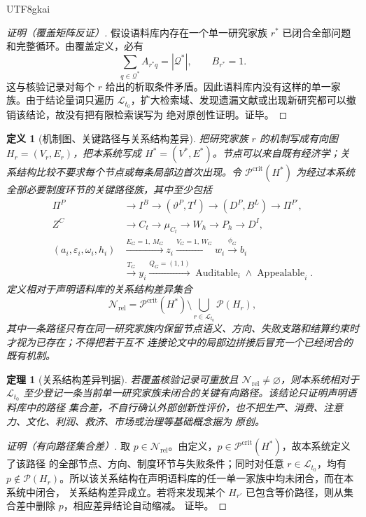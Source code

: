 \documentclass[12pt,a4paper,openany]{report}
\newtheorem{definition}{定义}[chapter]
\newtheorem{theorem}{定理}[chapter]
\DeclareMathOperator{\Auditable}{Auditable}
\DeclareMathOperator{\Appealable}{Appealable}
\begin{document}
\begin{CJK*}{UTF8}{gkai}
\begin{proof}[证明（覆盖矩阵反证）]
假设语料库内存在一个单一研究家族 \(r^*\) 已闭合全部问题和完整循环。由覆盖定义，必有
\[
  \sum_{q\in\mathcal Q^*}A_{r^*q}=|\mathcal Q^*|,
  \qquad B_{r^*}=1.
\]
这与核验记录对每个 \(r\) 给出的析取条件矛盾。因此语料库内没有这样的单一家族。由于结论量词只遍历
\(\mathcal L_{t_0}\)，扩大检索域、发现遗漏文献或出现新研究都可以撤销该结论，故没有把有限检索误写为
绝对原创性证明。证毕。
\end{proof}

\begin{definition}[机制图、关键路径与关系结构差异]
把研究家族 \(r\) 的机制写成有向图 \(H_r=(V_r,E_r)\)，把本系统写成
\(H^*=(V^*,E^*)\)。节点可以来自既有经济学；关系结构比较不要求每个节点或每条局部边首次出现。令
\(\mathcal P^{\mathrm{crit}}(H^*)\) 为经过本系统全部必要制度环节的关键路径族，其中至少包括
\[
\begin{aligned}
  \Pi^P
  &\longrightarrow I^B
  \longrightarrow(\vartheta^P,T^I)
  \longrightarrow(D^P,B^L)
  \longrightarrow\Pi^{P\prime},\\
  Z^C
  &\longrightarrow C_t
  \longrightarrow\mu_{C_t}
  \longrightarrow W_h
  \longrightarrow P_h
  \longrightarrow D^I,\\
  (a_i,\varepsilon_i,\omega_i,h_i)
  &\xrightarrow{E_G=1,\,M_G}z_i
  \xrightarrow{V_G=1,\,W_G}w_i
  \xrightarrow{\phi_G}b_i\\
  &\xrightarrow{T_G}y_i
  \xrightarrow{Q_G=(1,1)}
  \Auditable_i\wedge\Appealable_i.
\end{aligned}
\]
定义相对于声明语料库的关系结构差异集合
\[
  \mathcal N_{\mathrm{rel}}
  =
  \mathcal P^{\mathrm{crit}}(H^*)
  \setminus
  \bigcup_{r\in\mathcal L_{t_0}}\mathcal P(H_r),
\]
其中一条路径只有在同一研究家族内保留节点语义、方向、失败支路和结算约束时才视为已存在；不得把若干互不
连接论文中的局部边拼接后冒充一个已经闭合的既有机制。
\end{definition}

\begin{theorem}[关系结构差异判据]
\label{thm:relational-architecture-innovation}
若覆盖核验记录可重放且 \(\mathcal N_{\mathrm{rel}}\ne\varnothing\)，则本系统相对于
\(\mathcal L_{t_0}\) 至少登记一条当前单一研究家族未闭合的关键有向路径。该结论只证明声明语料库中的路径
集合差，不自行确认外部创新性评价，也不把生产、消费、注意力、文化、利润、救济、市场或治理等基础概念据为
原创。
\end{theorem}

\begin{proof}[证明（有向路径集合差）]
取 \(p\in\mathcal N_{\mathrm{rel}}\)。由定义，\(p\in\mathcal P^{\mathrm{crit}}(H^*)\)，故本系统定义了该路径
的全部节点、方向、制度环节与失败条件；同时对任意 \(r\in\mathcal L_{t_0}\)，均有
\(p\notin\mathcal P(H_r)\)。所以该关系结构在声明语料库的任一单一家族中均未闭合，而在本系统中闭合，
关系结构差异成立。若将来发现某个 \(H_{r'}\) 已包含等价路径，则从集合差中删除 \(p\)，相应差异结论自动缩减。
证毕。
\end{proof}


\end{CJK*}
\end{document}
